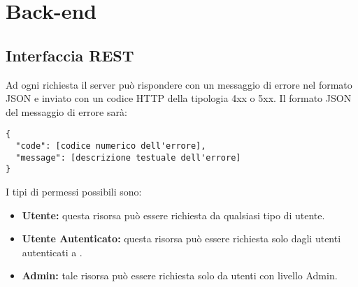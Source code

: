 \section{Back-end}


\subsection{Interfaccia REST}

Ad ogni richiesta il server può rispondere con un messaggio di errore nel formato JSON e inviato con un codice HTTP della tipologia 4xx o 5xx. 
Il formato JSON del messaggio di errore sarà:
\begin{lstlisting}
{ 
  "code": [codice numerico dell'errore],
  "message": [descrizione testuale dell'errore]
}
\end{lstlisting}
I tipi di permessi possibili sono: 
\begin{itemize}
\item \textbf{Utente: } questa risorsa può essere richiesta da qualsiasi tipo di utente.
\item \textbf{Utente Autenticato: } questa risorsa può essere richiesta solo dagli utenti autenticati a .
\item \textbf{Admin:} tale risorsa può essere richiesta solo da utenti con livello Admin.
\end{itemize}


